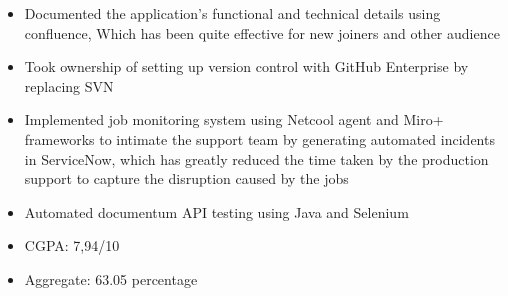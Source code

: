 \documentclass[10pt,a4paper,ragged2e,withhyper]{altacv}
\begin{document}
\begin{paracol}{2}
\begin{itemize}
                \item Documented the application's functional and technical details using confluence, Which has been quite effective for new joiners and other audience 
                \item Took ownership of setting up version control with GitHub Enterprise by replacing SVN 
                \item Implemented job monitoring system using Netcool agent and Miro+ frameworks to intimate the support team by generating automated incidents in ServiceNow, which has greatly reduced the time taken by the production support to capture the disruption caused by the jobs 
                \item Automated documentum API testing using Java and Selenium
            \end{itemize}
            

            \begin{itemize}
                \item CGPA: 7,94/10
            \end{itemize}
            \divider
            
            \begin{itemize}
                \item Aggregate: 63.05 percentage
                
            \end{itemize}
    \end{paracol}
\end{document}

